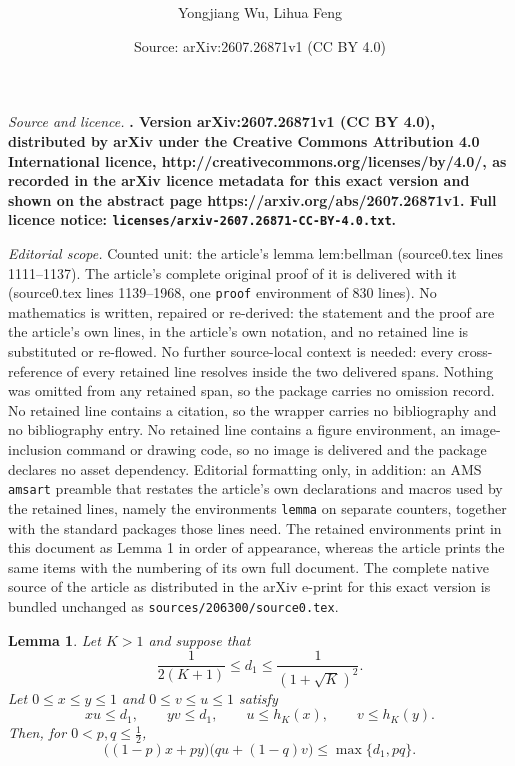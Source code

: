 \documentclass[10pt,a4paper]{amsart}
\title{\bf \Large}
\author{Yongjiang Wu, Lihua Feng}
\date{Source: arXiv:2607.26871v1 (CC BY 4.0)}
\newtheorem{lemma}{Lemma}
\begin{document}
\maketitle

\noindent\emph{Source and licence.} \bf \Large. Version arXiv:2607.26871v1 (CC BY 4.0), distributed by arXiv under the Creative Commons Attribution 4.0 International licence, http://creativecommons.org/licenses/by/4.0/, as recorded in the arXiv licence metadata for this exact version and shown on the abstract page https://arxiv.org/abs/2607.26871v1. Full licence notice: \texttt{licenses/arxiv-2607.26871-CC-BY-4.0.txt}.\par\smallskip

\noindent\textit{Editorial scope.} Counted unit: the article's lemma lem:bellman (source0.tex lines 1111--1137). The article's complete original proof of it is delivered with it (source0.tex lines 1139--1968, one \texttt{proof} environment of 830 lines). No mathematics is written, repaired or re-derived: the statement and the proof are the article's own lines, in the article's own notation, and no retained line is substituted or re-flowed.  No further source-local context is needed: every cross-reference of every retained line resolves inside the two delivered spans.  Nothing was omitted from any retained span, so the package carries no omission record.  No retained line contains a citation, so the wrapper carries no bibliography and no bibliography entry.  No retained line contains a figure environment, an image-inclusion command or drawing code, so no image is delivered and the package declares no asset dependency.  Editorial formatting only, in addition: an AMS \texttt{amsart} preamble that restates the article's own declarations and macros used by the retained lines, namely the environments \texttt{lemma} on separate counters, together with the standard packages those lines need.  The retained environments print in this document as Lemma 1 in order of appearance, whereas the article prints the same items with the numbering of its own full document.  The complete native source of the article as distributed in the arXiv e-print for this exact version is bundled unchanged as \texttt{sources/206300/source0.tex}.
\begin{lemma}\label{lem:bellman}
Let $K>1$ and suppose that
\begin{equation*}
 \frac{1}{2(K+1)}
 \leq d_1
 \leq
 \frac{1}{(1+\sqrt K)^2}.
\end{equation*}
Let $0\leq x\leq y\leq1$ and $0\leq v\leq u\leq1$ satisfy
\begin{equation*}
 xu\leq d_1,
 \qquad
 yv\leq d_1,
 \qquad
 u\leq h_K(x),
 \qquad
 v\leq h_K(y).
\end{equation*}
Then, for $0<p,q\leq\frac{1}{2}$,
\begin{equation}
 \bigl((1-p)x+py\bigr)
 \bigl(qu+(1-q)v\bigr)
 \leq
 \max\{d_1,pq\}.
 \label{eq:bellman}
\end{equation}
\end{lemma}
\end{document}
